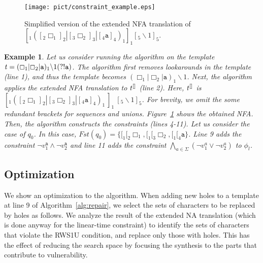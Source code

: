 \documentclass[conference]{IEEEtran}
\newcommand{\hole}{\Box}
\newcommand{\sstate}{{\it t}}
\newcommand{\follow}{\textit{Fst}}
\newcommand{\ltp}{RWS1U}
\newtheorem{example}{Example}[section]
\begin{document}
\begin{figure}[t]
\begin{center}
\texttt{[image: pict/constraint\_example.eps]}
\caption{Simplified version of the extended NFA translation of $[_1([_2 \hole_1 ]_2 | [_3 \hole_2 ]_3 | [_4 \texttt{a} ]_4 )_1 ]_1 [_5 \backslash 1 ]_5$.}
\label{fig:constexa}
\end{center}
\end{figure}
\begin{example}
\normalfont
Let us consider running the algorithm on the template $\sstate{} = (\hole_1 | \hole_2 | \texttt{a})_1 \backslash 1 (\mbox{?!}\texttt{a})$.
The algorithm first removes lookarounds in the template (line 1), and thus the template becomes $(\hole_1 | \hole_2 | \texttt{a})_1 \backslash 1$.
Next, the algorithm applies the extended NFA translation to $\sstate{}^{[]}$ (line 2).
Here, $\sstate{}^{[]}$ is $[_1([_2 \hole_1 ]_2 | [_3 \hole_2 ]_3 | [_4 \texttt{a} ]_4 )_1\:]_1\: [_5 \backslash 1 ]_5$.
For brevity, we omit the some redundant brackets for sequences and unions.
Figure~\ref{fig:constexa} shows the obtained NFA.
Then, the algorithm constructs the constraints (lines 4-11).
Let us consider the case of $q_{0}$.
In this case, $\follow(q_{0}) = \{ [_1 [_2 \hole_1, [_1 [_3 \hole_2, [_1 [_4 \texttt{a}\}$.
Line 9 adds the constraint $\lnot v_1^\texttt{a} \land \lnot v_2^\texttt{a}$ and line 11 adds the constraint $\bigwedge_{a \in \Sigma} (\neg v_1^a \vee \neg v_2^a)$ to $\phi_l$.
\end{example}


















\subsection{Optimization}
\label{subsec:optim}
We show an optimization to the algorithm.  When adding new holes to a template at line 9 of Algorithm~\ref{alg:repair}, we select the sets of characters to be replaced by holes as follows.  We analyze the result of the extended {NA} translation (which is done anyway for the linear-time constraint) to identify the sets of characters that violate the \ltp{} condition, and replace only those with holes.  This has the effect of reducing the search space by focusing the synthesis to the parts that contribute to vulnerability.
\end{document}
